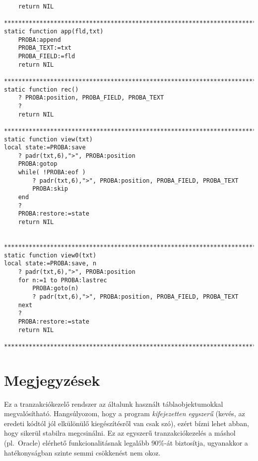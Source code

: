 \begin{verbatim}
    return NIL
    
*****************************************************************************
static function app(fld,txt)    
    PROBA:append
    PROBA_TEXT:=txt 
    PROBA_FIELD:=fld 
    return NIL

*****************************************************************************
static function rec()
    ? PROBA:position, PROBA_FIELD, PROBA_TEXT
    ?
    return NIL

*****************************************************************************
static function view(txt)
local state:=PROBA:save
    ? padr(txt,6),">", PROBA:position 
    PROBA:gotop
    while( !PROBA:eof )
        ? padr(txt,6),">", PROBA:position, PROBA_FIELD, PROBA_TEXT
        PROBA:skip
    end
    ?
    PROBA:restore:=state
    return NIL


*****************************************************************************
static function view0(txt)
local state:=PROBA:save, n
    ? padr(txt,6),">", PROBA:position 
    for n:=1 to PROBA:lastrec
        PROBA:goto(n)
        ? padr(txt,6),">", PROBA:position, PROBA_FIELD, PROBA_TEXT
    next
    ?
    PROBA:restore:=state
    return NIL
 
*****************************************************************************
\end{verbatim}


\section{Megjegyzések}
 
Ez a tranzakciókezelő rendszer az általunk használt táblaobjektumokkal
megvalósítható. %
Hangsúlyozom, hogy a program {\em kifejezetten egyszerű}
(kevés, az eredeti kódtól jól elkülönülő kiegészítésről van csak szó),
ezért bízni lehet abban, hogy sikerül stabilra megcsinálni.
Ez az egyszerű tranzakciókezelés a máshol 
(pl.\ Oracle) elérhető funkcionalitásnak
legalább 90\%-át biztosítja, ugyanakkor a hatékonyságban szinte
semmi csökkenést nem okoz.
 

 
